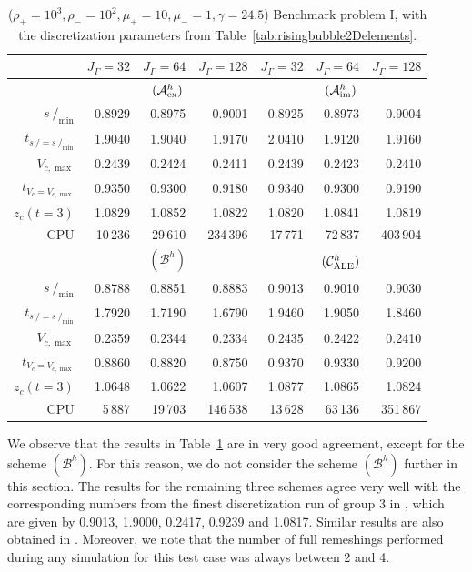 \documentclass[a4paper,12pt,onecolumn]{article}
\newcommand{\strikes}{\mbox{$s\!\!\!\!\:/$}}
\newcommand{\schemeAex}{{\mathcal{A}^h_{\rm ex}}}
\newcommand{\schemeAim}{{\mathcal{A}^h_{\rm im}}}
\newcommand{\schemeB}{{\mathcal{B}^h}}
\newcommand{\schemeALE}{{\mathcal{C}^h_{\rm ALE}}}
\begin{document}
\begin{table}
\center
\hspace*{-3.25cm}
\begin{tabular}{r|rrr|rrr|}
\hline
 & $J_\Gamma=32$ & $J_\Gamma=64$ & $J_\Gamma=128$
 & $J_\Gamma=32$ & $J_\Gamma=64$ & $J_\Gamma=128$ \\ \hline
& \multicolumn{3}{c|}{$(\schemeAex)$} & \multicolumn{3}{c|}{$(\schemeAim)$} \\
\cmidrule{2-7}
$\strikes_{\min}$                & 0.8929 & 0.8975 & 0.9001  & 0.8925 & 0.8973 & 0.9004 \\
$t_{\strikes = \strikes_{\min}}$ & 1.9040 & 1.9040 & 1.9170  & 2.0410 & 1.9120 & 1.9160 \\
$V_{c,\max}$                     & 0.2439 & 0.2424 & 0.2411  & 0.2439 & 0.2423 & 0.2410 \\
$t_{V_c = V_{c,\max}}$           & 0.9350 & 0.9300 & 0.9180  & 0.9340 & 0.9300 & 0.9190 \\
$z_c(t=3)$                       & 1.0829 & 1.0852 & 1.0822  & 1.0820 & 1.0841 & 1.0819 \\
CPU                              &  10\,236 &  29\,610 & 234\,396  &  17\,771 &  72\,837 & 403\,904 \\
\cmidrule{2-7}
& \multicolumn{3}{c|}{$(\schemeB)$} & \multicolumn{3}{c|}{$(\schemeALE)$} \\
\cmidrule{2-7}
$\strikes_{\min}$                & 0.8788 & 0.8851 & 0.8883  & 0.9013 & 0.9010 & 0.9030 \\
$t_{\strikes = \strikes_{\min}}$ & 1.7920 & 1.7190 & 1.6790  & 1.9460 & 1.9050 & 1.8460 \\
$V_{c,\max}$                     & 0.2359 & 0.2344 & 0.2334  & 0.2435 & 0.2422 & 0.2410 \\
$t_{V_c = V_{c,\max}}$           & 0.8860 & 0.8820 & 0.8750  & 0.9370 & 0.9330 & 0.9200 \\
$z_c(t=3)$                       & 1.0648 & 1.0622 & 1.0607  & 1.0877 & 1.0865 & 1.0824 \\
CPU                              &   5\,887 &  19\,703 & 146\,538  &  13\,628 &  63\,136 & 351\,867 \\
\hline
\end{tabular}
\hspace*{-3.25cm}
\caption{($\rho_+ = 10^3,\rho_- = 10^2,\mu_+ = 10,\mu_- =1,\gamma = 24.5$)
Benchmark problem I, with the discretization parameters from
Table~\ref{tab:risingbubble2Delements}.}
\label{tab:risingbubbleIp2p1p0}
\end{table}%
We observe that the results in Table~\ref{tab:risingbubbleIp2p1p0} are in very
good agreement, except for the scheme $(\schemeB)$. For this reason, we do
not consider the scheme $(\schemeB)$ further in this section.
The results for the remaining three schemes agree very well with
the corresponding
numbers from the finest discretization run of group 3 in \cite{HysingTKPBGT09},
which are given by 0.9013, 1.9000, 0.2417, 0.9239 and 1.0817.
Similar results are also obtained in \cite[Tables ~2 and 3]{fluidfbp}.
Moreover, we note that the number of full remeshings performed during
any simulation for this test case was always between 2 and 4.
\end{document}
